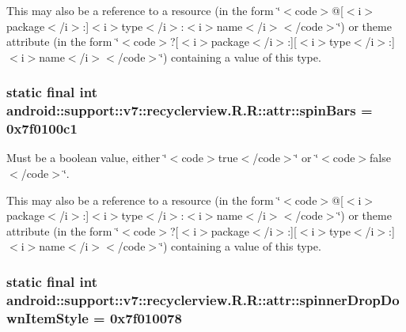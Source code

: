 This may also be a reference to a resource (in the form \char`\"{}$<$code$>$@\mbox{[}$<$i$>$package$<$/i$>$:\mbox{]}$<$i$>$type$<$/i$>$:$<$i$>$name$<$/i$>$$<$/code$>$\char`\"{}) or theme attribute (in the form \char`\"{}$<$code$>$?\mbox{[}$<$i$>$package$<$/i$>$:\mbox{]}\mbox{[}$<$i$>$type$<$/i$>$:\mbox{]}$<$i$>$name$<$/i$>$$<$/code$>$\char`\"{}) containing a value of this type. \hypertarget{classandroid_1_1support_1_1v7_1_1recyclerview_1_1_r_1_1attr_afba810e0a4736dddd963565713eefea}{
\subsubsection[{spinBars}]{\setlength{\rightskip}{0pt plus 5cm}static final int android::support::v7::recyclerview.R.R::attr::spinBars = 0x7f0100c1}}
\label{classandroid_1_1support_1_1v7_1_1recyclerview_1_1_r_1_1attr_afba810e0a4736dddd963565713eefea}


Must be a boolean value, either \char`\"{}$<$code$>$true$<$/code$>$\char`\"{} or \char`\"{}$<$code$>$false$<$/code$>$\char`\"{}. 

This may also be a reference to a resource (in the form \char`\"{}$<$code$>$@\mbox{[}$<$i$>$package$<$/i$>$:\mbox{]}$<$i$>$type$<$/i$>$:$<$i$>$name$<$/i$>$$<$/code$>$\char`\"{}) or theme attribute (in the form \char`\"{}$<$code$>$?\mbox{[}$<$i$>$package$<$/i$>$:\mbox{]}\mbox{[}$<$i$>$type$<$/i$>$:\mbox{]}$<$i$>$name$<$/i$>$$<$/code$>$\char`\"{}) containing a value of this type. \hypertarget{classandroid_1_1support_1_1v7_1_1recyclerview_1_1_r_1_1attr_2a3b9afca71a7c0bb792c6c7ff64828d}{
\subsubsection[{spinnerDropDownItemStyle}]{\setlength{\rightskip}{0pt plus 5cm}static final int android::support::v7::recyclerview.R.R::attr::spinnerDropDownItemStyle = 0x7f010078}}
\label{classandroid_1_1support_1_1v7_1_1recyclerview_1_1_r_1_1attr_2a3b9afca71a7c0bb792c6c7ff64828d}


